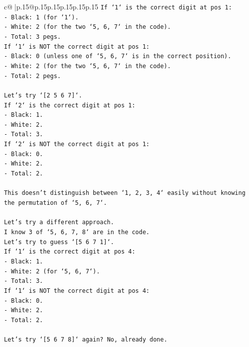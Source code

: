 \documentclass{article}
\begin{document}
{\begin{supertabular}{c@{$\;$}|p{.15\linewidth}@{}p{.15\linewidth}p{.15\linewidth}p{.15\linewidth}p{.15\linewidth}p{.15\linewidth}}
{{{\texttt{If `1` is the correct digit at pos 1:} \\
\texttt{{-} Black: 1 (for `1`).} \\
\texttt{{-} White: 2 (for the two `5, 6, 7` in the code).} \\
\texttt{{-} Total: 3 pegs.} \\
\texttt{If `1` is NOT the correct digit at pos 1:} \\
\texttt{{-} Black: 0 (unless one of `5, 6, 7` is in the correct position).} \\
\texttt{{-} White: 2 (for the two `5, 6, 7` in the code).} \\
\texttt{{-} Total: 2 pegs.} \\
\\ 
\texttt{Let's try `{[}2 5 6 7{]}`.} \\
\texttt{If `2` is the correct digit at pos 1:} \\
\texttt{{-} Black: 1.} \\
\texttt{{-} White: 2.} \\
\texttt{{-} Total: 3.} \\
\texttt{If `2` is NOT the correct digit at pos 1:} \\
\texttt{{-} Black: 0.} \\
\texttt{{-} White: 2.} \\
\texttt{{-} Total: 2.} \\
\\ 
\texttt{This doesn't distinguish between `1, 2, 3, 4` easily without knowing the permutation of `5, 6, 7`.} \\
\\ 
\texttt{Let's try a different approach.} \\
\texttt{I know 3 of `5, 6, 7, 8` are in the code.} \\
\texttt{Let's try to guess `{[}5 6 7 1{]}`.} \\
\texttt{If `1` is the correct digit at pos 4:} \\
\texttt{{-} Black: 1.} \\
\texttt{{-} White: 2 (for `5, 6, 7`).} \\
\texttt{{-} Total: 3.} \\
\texttt{If `1` is NOT the correct digit at pos 4:} \\
\texttt{{-} Black: 0.} \\
\texttt{{-} White: 2.} \\
\texttt{{-} Total: 2.} \\
\\ 
\texttt{Let's try `{[}5 6 7 8{]}` again? No, already done.} \\
}}}
\end{supertabular}}
\end{document}
